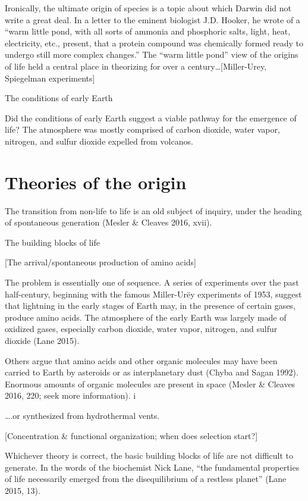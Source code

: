 \documentclass{tufte-book} %
\begin{document}
Ironically, the ultimate origin of species is a topic about which Darwin did not write a great deal. In a letter to the eminent biologist J.D. Hooker, he wrote of a “warm little pond, with all sorts of ammonia and phosphoric salts, light, heat, electricity, etc., present, that a protein compound was chemically formed ready to undergo still more complex changes.” The “warm little pond” view of the origins of life held a central place in theorizing for over a century…[Miller-Urey, Spiegelman experiments]

The conditions of early Earth

Did the conditions of early Earth suggest a viable pathway for the emergence of life? The atmosphere was mostly comprised of carbon dioxide, water vapor, nitrogen, and sulfur dioxide expelled from volcanos. 	

\section{Theories of the origin}\label{origin-theories}

The transition from non-life to life is an old subject of inquiry, under the heading of spontaneous generation (Mesler & Cleaves 2016, xvii). 

The building blocks of life

[The arrival/spontaneous production of amino acids]

The problem is essentially one of sequence. A series of experiments over the past half-century, beginning with the famous Miller-Urëy experiments of 1953, suggest that lightning in the early stages of Earth may, in the presence of certain gases, produce amino acids. The atmosphere of the early Earth was largely made of oxidized gases, especially carbon dioxide, water vapor, nitrogen, and sulfur dioxide (Lane 2015).

Others argue that amino acids and other organic molecules may have been carried to Earth by asteroids or as interplanetary dust (Chyba and Sagan 1992). Enormous amounts of organic molecules are present in space (Mesler & Cleaves 2016, 220; seek more information).
	i


….or synthesized from hydrothermal vents. 



[Concentration & functional organization; when does selection start?]

Whichever theory is correct, the basic building blocks of life are not difficult to generate. In the words of the biochemist Nick Lane, “the fundamental properties of life necessarily emerged from the disequilibrium of a restless planet” (Lane 2015, 13). 
\end{document}

